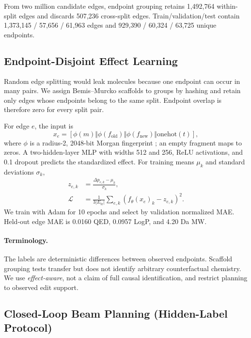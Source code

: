 \documentclass[journal=jcisd8,manuscript=article,email=false]{achemso}
\begin{document}
From two million candidate edges, endpoint grouping retains 1,492,764 within-split edges and discards 507,236 cross-split edges. Train/validation/test contain 1,373,145 / 57,656 / 61,963 edges and 929,390 / 60,324 / 63,725 unique endpoints.

\subsection{Endpoint-Disjoint Effect Learning}

Random edge splitting would leak molecules because one endpoint can occur in many pairs. We assign Bemis--Murcko scaffolds \citep{bemis1996frameworks} to groups by hashing and retain only edges whose endpoints belong to the same split. Endpoint overlap is therefore zero for every split pair.

For edge $e$, the input is
\[
x_e=[\phi(m)\Vert\phi(f_{\mathrm{old}})\Vert
\phi(f_{\mathrm{new}})\Vert\mathrm{onehot}(t)],
\]
where $\phi$ is a radius-2, 2048-bit Morgan fingerprint \citep{rogers2010ecfp}; an empty fragment maps to zeros. A two-hidden-layer MLP with widths 512 and 256, ReLU activations, and 0.1 dropout predicts the standardized effect. For training means $\mu_k$ and standard deviations $\sigma_k$,
\begin{align}
z_{e,k}&=\frac{\Delta p_{e,k}-\mu_k}{\sigma_k},\\
\mathcal{L}&=\frac{1}{3|E_{\mathrm{tr}}|}\sum_{e,k}
\left(f_\theta(x_e)_k-z_{e,k}\right)^2.
\end{align}
We train with Adam for 10 epochs and select by validation normalized MAE. Held-out edge MAE is 0.0160 QED, 0.0957 LogP, and 4.20 Da MW.

\paragraph{Terminology.}
The labels are deterministic differences between observed endpoints. Scaffold grouping tests transfer but does not identify arbitrary counterfactual chemistry. We use \emph{effect-aware}, not a claim of full causal identification, and restrict planning to observed edit support.

\subsection{Closed-Loop Beam Planning (Hidden-Label Protocol)}
\end{document}
